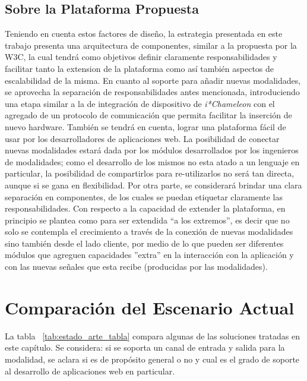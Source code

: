 \subsection{Sobre la Plataforma Propuesta}
Teniendo en cuenta estos factores de diseño, la estrategia presentada en este trabajo presenta una arquitectura de componentes, similar a la propuesta por la W3C, la cual tendrá como objetivos definir claramente responsabilidades y facilitar tanto la extension de la plataforma como así también aspectos de escalabilidad de la misma. En cuanto al soporte para añadir nuevas modalidades, se aprovecha la separación de responsabilidades antes mencionada, introduciendo una etapa similar a la de integración de dispositivo de \emph{i*Chameleon} con el agregado de un protocolo de comunicación que permita facilitar la inserción de nuevo hardware.
También se tendrá en cuenta, lograr una plataforma fácil de usar por los desarrolladores de aplicaciones web. La posibilidad de conectar nuevas modalidades estará dada por los módulos desarrollados por los ingenieros de modalidades; como el desarrollo de los mismos no esta atado a un lenguaje en particular, la posibilidad de compartirlos para re-utilizarlos no será tan directa, aunque si se gana en flexibilidad. Por otra parte, se considerará brindar una clara separación en componentes, de los cuales se puedan etiquetar claramente las responsabilidades. Con respecto a la capacidad de extender la plataforma, en principio se plantea como para ser extendida ``a los extremos'', es decir que no solo se contempla el crecimiento a través de la conexión de nuevas modalidades sino también desde el lado cliente, por medio de lo que pueden ser diferentes módulos que agreguen capacidades ''extra'' en la interacción con la aplicación y con las nuevas señales que esta recibe (producidas por las modalidades).

\section{Comparación del Escenario Actual}
La tabla ~\ref{tab:estado_arte_tabla} compara algunas de las soluciones tratadas en este capítulo. Se considera: si se soporta un canal de entrada y salida para la modalidad, se aclara si es de propósito general o no y cual es el grado de soporte al desarrollo de aplicaciones web en particular.

